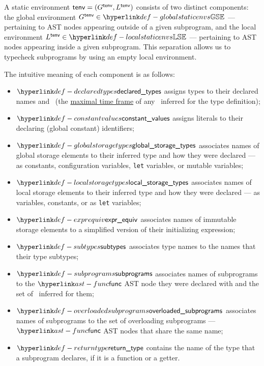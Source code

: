 A static environment $\textsf{tenv}=(G^{\textsf{tenv}}, L^{\textsf{tenv}})$ consists of two
distinct components: the global environment $G^\tenv \in \globalstaticenvs$ --- pertaining to AST nodes
appearing outside of a given subprogram, and the local environment
$L^\tenv \in \localstaticenvs$ --- pertaining to AST nodes appearing inside a given subprogram.
This separation allows us to typecheck subprograms by using an empty local environment.

The intuitive meaning of each component is as follows:
\begin{itemize}
  \hypertarget{def-declaredtypes}{}
  \item $\declaredtypes$ assigns types to their declared names and \timeframeterm\
  (the \hyperlink{def-maxtimeframe}{maximal time frame} of any \sideeffectdescriptorterm\ inferred for
  the type definition);
  \hypertarget{def-constantvalues}{}
  \item $\constantvalues$ assigns literals to their declaring (global constant) identifiers;
  \hypertarget{def-globalstoragetypes}{}
  \item $\globalstoragetypes$ associates names of global storage elements to their inferred type
  and how they were declared --- as constants, configuration variables, \texttt{let} variables,
  or mutable variables;
  \hypertarget{def-localstoragetypes}{}
  \item $\localstoragetypes$ associates names of local storage elements to their inferred type
  and how they were declared --- as variables, constants, or as \texttt{let} variables;
  \hypertarget{def-exprequiv}{}
  \item $\exprequiv$ associates names of immutable storage elements to a simplified version
  of their initializing expression;
  \hypertarget{def-subtypes}{}
  \item $\subtypes$ associates type names to the names that their type subtypes;
  \hypertarget{def-subprograms}{}
  \item $\subprograms$ associates names of subprograms to the $\func$ AST node they were
  declared with and the set of \sideeffectdescriptorsterm\ inferred for them;
  \hypertarget{def-overloadedsubprograms}{}
  \item $\overloadedsubprograms$ associates names of subprograms to the set of overloading
  subprograms ---  $\func$ AST nodes that share the same name;
  \hypertarget{def-returntype}{}
  \item $\returntype$ contains the name of the type that a subprogram declares, if it is
  a function or a getter.
\end{itemize}


